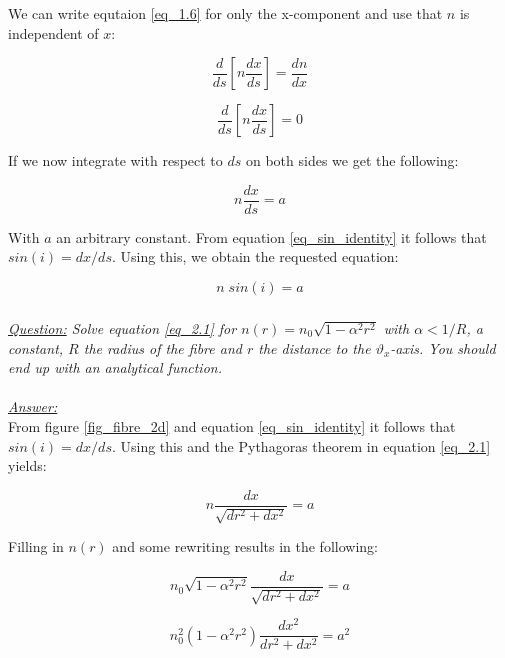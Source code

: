 \documentclass{article}
\begin{document}
We can write equtaion \ref{eq_1.6} for only the x-component and use that $n$ is independent of $x$:

\begin{equation}
	\frac{d}{ds} \left[ n \frac{d x}{ds} \right] = \frac{d n}{dx}
\end{equation}

\begin{equation}
	\frac{d}{ds} \left[ n \frac{d x}{ds} \right] = 0
\end{equation}

If we now integrate with respect to $ds$ on both sides we get the following:

\begin{equation}
	n \frac{d x}{ds} = a
\end{equation}

With $a$ an arbitrary constant. From  equation \ref{eq_sin_identity} it follows that $sin(i) = dx/ds$. Using this, we obtain the requested equation:

\begin{equation}
	n \; sin(i) = a
\end{equation}

\subsubsection{}

\textit{\underline{Question:} Solve equation \ref{eq_2.1} for $n(r) = n_0 \sqrt{1 - \alpha ^2 r^2}$ with $\alpha < 1/R$, a constant, $R$ the radius of the fibre and $r$ the distance to the $\vartheta _x$-axis. You should end up with an analytical function.}\\
\\
\textit{\underline{Answer:}} \\
From figure \ref{fig_fibre_2d} and equation \ref{eq_sin_identity} it follows that $ sin(i) = dx/ds$. Using this and the Pythagoras theorem in equation \ref{eq_2.1} yields:

\begin{equation*}
	n  \frac{dx}{\sqrt{dr^2 + dx^2}} = a
\end{equation*}

Filling in $n(r)$ and some rewriting results in the following:

\begin{equation*}
	n_0 \sqrt{1 - \alpha ^2 r^2}  \frac{dx}{\sqrt{dr^2 + dx^2}} = a
\end{equation*}

\begin{equation*}
	n_0^2 (1 - \alpha ^2 r^2)  \frac{dx^2}{dr^2 + dx^2} = a^2
\end{equation*}
\end{document}
